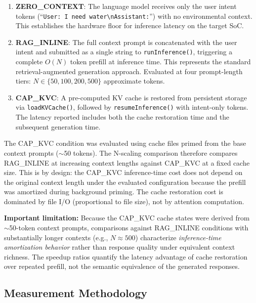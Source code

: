 \documentclass[journal]{IEEEtran}
\begin{document}
\begin{enumerate}
    \item \textbf{ZERO\_CONTEXT}: The language model receives only the user intent tokens (``\texttt{User: I need water\textbackslash nAssistant:}'') with no environmental context. This establishes the hardware floor for inference latency on the target SoC.

    \item \textbf{RAG\_INLINE}: The full context prompt is concatenated with the user intent and submitted as a single string to \texttt{runInference()}, triggering a complete $O(N)$ token prefill at inference time. This represents the standard retrieval-augmented generation approach. Evaluated at four prompt-length tiers: $N \in \{50, 100, 200, 500\}$ approximate tokens.

    \item \textbf{CAP\_KVC}: A pre-computed KV cache is restored from persistent storage via \texttt{loadKVCache()}, followed by \texttt{resumeInference()} with intent-only tokens. The latency reported includes both the cache restoration time and the subsequent generation time.
\end{enumerate}

The CAP\_KVC condition was evaluated using cache files primed from the base context prompts ($\sim$50 tokens). The N-scaling comparison therefore compares RAG\_INLINE at increasing context lengths against CAP\_KVC at a fixed cache size. This is by design: the CAP\_KVC inference-time cost does not depend on the original context length under the evaluated configuration because the prefill was amortized during background priming. The cache restoration cost is dominated by file I/O (proportional to file size), not by attention computation.

\textbf{Important limitation:} Because the CAP\_KVC cache states were derived from $\sim$50-token context prompts, comparisons against RAG\_INLINE conditions with substantially longer contexts (e.g., $N \approx 500$) characterize \emph{inference-time amortization behavior} rather than response quality under equivalent context richness. The speedup ratios quantify the latency advantage of cache restoration over repeated prefill, not the semantic equivalence of the generated responses.

\subsection{Measurement Methodology}
\label{sec:measurement}
\end{document}
